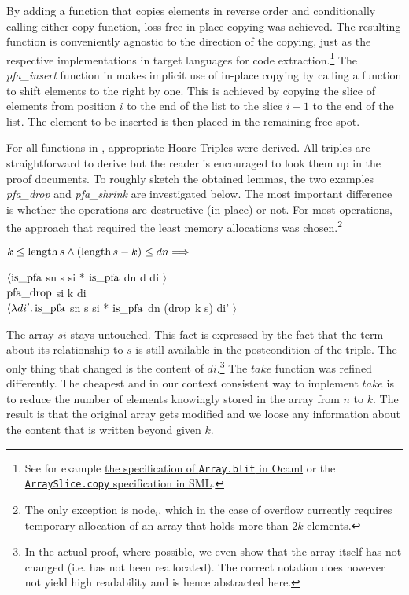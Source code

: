 By adding a function that copies elements in reverse order
and conditionally calling either copy function,
loss-free in-place copying was achieved.
The resulting function is conveniently agnostic to the direction
of the copying, just as the respective implementations
in target languages for code extraction.\footnote{
    See for example \href{https://caml.inria.fr/pub/docs/manual-ocaml/libref/Array.html}{the specification of \texttt{Array.blit} in Ocaml} or
    the \href{https://smlfamily.github.io/Basis/array-slice.html\#SIG:ARRAY_SLICE.copy:VAL}{\texttt{ArraySlice.copy} specification in SML}.
}
The \textit{pfa\_insert} function in  makes
implicit use of in-place copying by calling a function to shift elements
to the right by one.
This is achieved by copying the slice of elements
from position $i$ to the end of the list
to the slice $i+1$ to the end of the list.
The element to be inserted is then placed in the remaining free spot.

For all functions in ,
appropriate Hoare Triples were derived.
All triples are straightforward to derive but the reader is encouraged
to look them up in the proof documents.
To roughly sketch the obtained lemmas, the two examples
\textit{pfa\_drop} and \textit{pfa\_shrink} are investigated below.
The most important difference is whether
the operations are destructive (in-place) or not.
For most operations, the approach that required the least
memory allocations was chosen.\footnote{
    The only exception is node$_i$, which in the case of overflow
    currently requires temporary allocation of an array that holds more than $2k$ elements.
}

\begin{lemma}
    $k \le \operatorname{length} s \wedge (\operatorname{length} s - k) \le dn \Longrightarrow$ \\
    \begin{center}
    $\langle \operatorname{is\_pfa}$ sn s si * $\operatorname{is\_pfa}$ dn d di $\rangle$ \\
    $\operatorname{pfa\_drop}$ si k di \\
    $\langle\lambda di'. \operatorname{is\_pfa}$ sn s si * $\operatorname{is\_pfa}$ dn ($\operatorname{drop}$ k s) di' $\rangle$
    \end{center}
\end{lemma}

The array $si$ stays untouched.
This fact is expressed by the fact that the term about its relationship to $s$
is still available in the postcondition of the triple.
The only thing that changed is the content of $di$.\footnote{
    In the actual proof, where possible, we even show that the array itself has not changed
    (i.e. has not been reallocated).
    The correct notation does however not yield high readability
    and is hence abstracted here.
}
The $take$ function was refined differently.
The cheapest and in our context consistent way to
implement $take$ is to
reduce the number of elements knowingly stored in the array
from $n$ to $k$.
The result is that the original array gets modified and we loose any information
about the content that is written beyond given $k$.

